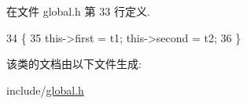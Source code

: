 在文件 global.\+h 第 33 行定义.


\begin{DoxyCode}
34     \{
35         this->first = t1; this->second = t2;
36     \}
\end{DoxyCode}


该类的文档由以下文件生成\+:\begin{DoxyCompactItemize}
\item 
include/\hyperlink{global_8h}{global.\+h}\end{DoxyCompactItemize}
